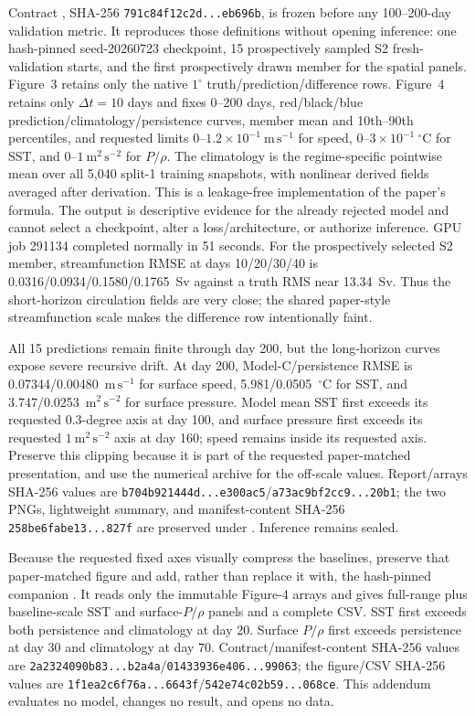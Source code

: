 \documentclass[11pt]{article}
\begin{document}
Contract , SHA-256
\texttt{791c84f12c2d...eb696b}, is frozen before any 100--200-day validation metric.
It reproduces those definitions without opening inference: one hash-pinned
seed-20260723 checkpoint, 15 prospectively sampled S2 fresh-validation starts, and the
first prospectively drawn member for the spatial panels.  Figure~3 retains only the
native \(1^\circ\) truth/prediction/difference rows.  Figure~4 retains only
\(\Delta t=10\) days and fixes 0--200 days, red/black/blue
prediction/climatology/persistence curves, member mean and 10th--90th percentiles,
and requested limits 0--\(1.2\times10^{-1}\ \mathrm{m\,s^{-1}}\) for speed,
0--\(3\times10^{-1}\ ^\circ\mathrm{C}\) for SST, and
0--\(1\ \mathrm{m^2\,s^{-2}}\) for \(P/\rho\).  The climatology is the
regime-specific pointwise mean over all 5,040 split-1 training snapshots, with
nonlinear derived fields averaged after derivation.  This is a leakage-free
implementation of the paper's formula.  The output is descriptive evidence for the
already rejected model and cannot select a checkpoint, alter a loss/architecture, or
authorize inference.  GPU job 291134 completed normally in 51 seconds.  For the
prospectively selected S2 member, streamfunction RMSE at days 10/20/30/40 is
0.0316/0.0934/0.1580/0.1765~Sv against a truth RMS near 13.34~Sv.  Thus the
short-horizon circulation fields are very close; the shared paper-style
streamfunction scale makes the difference row intentionally faint.

All 15 predictions remain finite through day 200, but the long-horizon curves expose
severe recursive drift.  At day 200, Model-C/persistence RMSE is
0.07344/0.00480~\(\mathrm{m\,s^{-1}}\) for surface speed,
5.981/0.0505~\({}^{\circ}\mathrm{C}\) for SST, and
3.747/0.0253~\(\mathrm{m^2\,s^{-2}}\) for surface pressure.  Model mean SST
first exceeds its requested 0.3-degree axis at day 100, and surface pressure first
exceeds its requested \(1\ \mathrm{m^2\,s^{-2}}\) axis at day 160; speed remains
inside its requested axis.  Preserve this clipping because it is part of the requested
paper-matched presentation, and use the numerical archive for the off-scale values.
Report/arrays SHA-256 values are
\texttt{b704b921444d...e300ac5}/\texttt{a73ac9bf2cc9...20b1}; the two PNGs,
lightweight summary, and manifest-content SHA-256
\texttt{258be6fabe13...827f} are preserved under
.  Inference remains sealed.

Because the requested fixed axes visually compress the baselines, preserve that
paper-matched figure and add, rather than replace it with, the hash-pinned companion
.  It reads only the immutable Figure-4
arrays and gives full-range plus baseline-scale SST and surface-\(P/\rho\) panels and
a complete CSV.  SST first exceeds both persistence and climatology at day 20.
Surface \(P/\rho\) first exceeds persistence at day 30 and climatology at day 70.
Contract/manifest-content SHA-256 values are
\texttt{2a2324090b83...b2a4a}/\texttt{01433936e406...99063}; the figure/CSV SHA-256
values are \texttt{1f1ea2c6f76a...6643f}/\texttt{542e74c02b59...068ce}.  This
addendum evaluates no model, changes no result, and opens no data.
\end{document}
